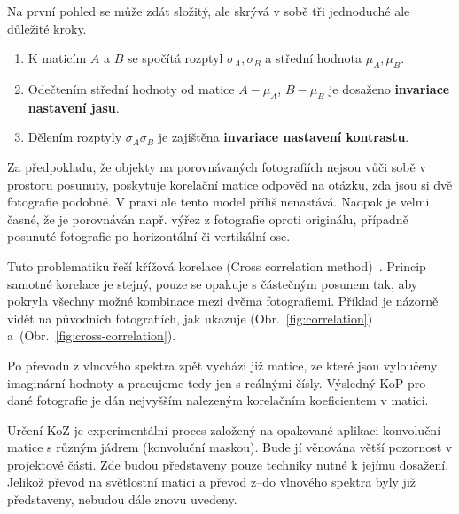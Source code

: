Na první pohled se může zdát složitý, ale skrývá v sobě tři jednoduché ale důležité kroky.
\begin{enumerate}
	\setlength{\parskip}{0pt}
	\setlength{\itemsep}{0pt}
	\item{K maticím $ A $ a $ B $ se spočítá rozptyl $ \sigma_{A}, \sigma_{B} $ a střední hodnota $ \mu_{A}, \mu_{B} $.}
	\item{Odečtením střední hodnoty od matice $ A - \mu_{A} $, $ B - \mu_{B} $ je dosaženo \textbf{invariace nastavení jasu}.}
	\item{Dělením rozptyly $ \sigma_{A} \sigma_{B} $ je zajištěna \textbf{invariace nastavení kontrastu}.}
\end{enumerate}

Za předpokladu, že objekty na porovnávaných fotografiích nejsou vůči sobě v prostoru posunuty, poskytuje korelační matice odpověď na otázku, zda jsou si dvě fotografie podobné. V praxi ale tento model příliš nenastává. Naopak je velmi časné, že je porovnáván např. výřez z fotografie oproti originálu, případně posunuté fotografie po horizontální či vertikální ose.

Tuto problematiku řeší křížová korelace (Cross correlation method)~\cite{cross-correlation}. Princip samotné korelace je stejný, pouze se opakuje s částečným posunem tak, aby pokryla všechny možné kombinace mezi dvěma fotografiemi. Příklad je názorně vidět na původních fotografiích, jak ukazuje (Obr.~\ref{fig:correlation}) a~(Obr.~\ref{fig:cross-correlation}).



Po převodu z vlnového spektra zpět vychází již matice, ze které jsou vyloučeny imaginární hodnoty a pracujeme tedy jen s reálnými čísly. Výsledný KoP pro dané fotografie je dán nejvyšším nalezeným korelačním koeficientem v matici.

Určení KoZ je experimentální proces založený na opakované aplikaci konvoluční matice s různým jádrem (konvoluční maskou). Bude jí věnována větší pozornost v projektové části. Zde budou představeny pouze techniky nutné k jejímu dosažení. Jelikož převod na světlostní matici a převod z--do vlnového spektra byly již představeny, nebudou dále znovu uvedeny.

